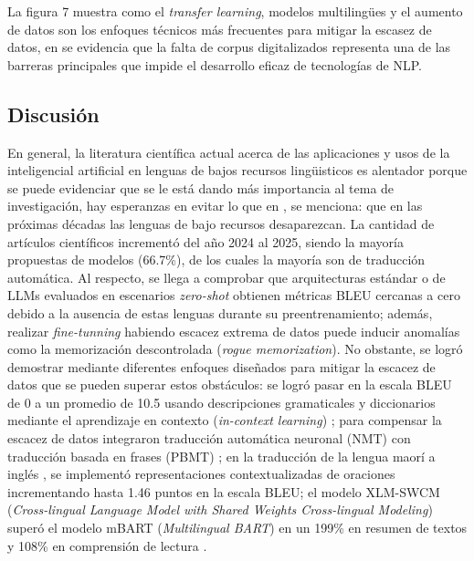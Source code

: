 La figura 7 muestra como el \textit{transfer learning}, modelos multilingües y el aumento de datos son los enfoques técnicos más frecuentes para mitigar la escasez de datos, en \cite{Liu2022} \cite{Chang2025} se evidencia que la falta de corpus digitalizados representa una de las barreras principales que impide el desarrollo eficaz de tecnologías de NLP.


\subsection{Discusión}
En general, la literatura científica actual acerca de las aplicaciones y usos de la inteligencial artificial en lenguas de bajos recursos lingüisticos es alentador porque se puede evidenciar que se le está dando más importancia al tema de investigación, hay esperanzas en evitar lo que en \cite{Zhang2024}, \cite{Cavalin2024} se menciona: que en las próximas décadas las lenguas de bajo recursos desaparezcan. La cantidad de artículos científicos incrementó del año 2024 al 2025, siendo la mayoría propuestas de modelos (66.7\%), de los cuales la mayoría son de traducción automática. Al respecto, se llega a comprobar que arquitecturas estándar o de LLMs evaluados en escenarios \textit{zero-shot} obtienen métricas BLEU cercanas a cero debido a la ausencia de estas lenguas durante su preentrenamiento; además, realizar \textit{fine-tunning} habiendo escacez extrema de datos puede inducir anomalías como la memorización descontrolada (\textit{rogue memorization}). No obstante, se logró demostrar mediante diferentes enfoques diseñados para mitigar la escacez de datos que se pueden superar estos obstáculos: se logró pasar en la escala BLEU de 0 a un promedio de 10.5 usando descripciones gramaticales y diccionarios mediante el aprendizaje en contexto (\textit{in-context learning}) \cite{Zhang2024}; para compensar la escacez de datos integraron traducción automática neuronal (NMT) con traducción basada en frases (PBMT) \cite{Chang2025}; en la traducción de la lengua maorí a inglés \cite{Hou2026}, se implementó representaciones contextualizadas de oraciones incrementando hasta 1.46 puntos en la escala BLEU; el modelo XLM-SWCM (\textit{Cross-lingual Language Model with Shared Weights Cross-lingual Modeling}) superó el modelo mBART (\textit{Multilingual BART}) en un 199\% en resumen de textos y 108\% en comprensión de lectura \cite{Su2025}. 

